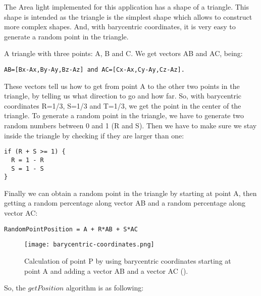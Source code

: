 \par
The Area light implemented for this application has a shape of a triangle.
This shape is intended as the triangle is the simplest shape which allows to construct more complex shapes.
And, with barycentric coordinates, it is very easy to generate a random point in the triangle.

\par
A triangle with three points: A, B and C.
We get vectors AB and AC, being:

\begin{lstlisting}[caption={Vectors AB and AC in a triangle}, captionpos=b, label=AreaLight]
AB=[Bx-Ax,By-Ay,Bz-Az] and AC=[Cx-Ax,Cy-Ay,Cz-Az].
\end{lstlisting}

\par
These vectors tell us how to get from point A to the other two points in the triangle, by telling us what direction to go and how far.
So, with barycentric coordinates R=1/3, S=1/3 and T=1/3, we get the point in the center of the triangle.
To generate a random point in the triangle, we have to generate two random numbers between 0 and 1 (R and S).
Then we have to make sure we stay inside the triangle by checking if they are larger than one:

\begin{lstlisting}[caption={Algorithm of Area light}, captionpos=b, label=AreaLight]
if (R + S >= 1) {
  R = 1 - R
  S = 1 - S
}
\end{lstlisting}

Finally we can obtain a random point in the triangle by starting at point A, then getting a random percentage along vector AB and a random percentage along vector AC:

\begin{lstlisting}[caption={Algorithm of Area light}, captionpos=b, label=AreaLight]
RandomPointPosition = A + R*AB + S*AC
\end{lstlisting}

\begin{figure}[H]
	\centering
	\caption{Calculation of point P by using barycentric coordinates starting at point A and adding a vector AB and a vector AC (\cite{TriangleBarycentricCoordinates}).}
	\label{Barycentric_Coordinates.}
	\texttt{[image: barycentric-coordinates.png]}
\end{figure}

\par
So, the
$getPosition$
algorithm is as following:

